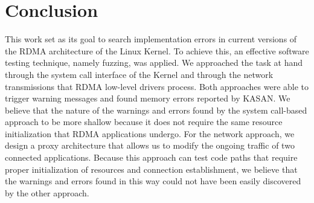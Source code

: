 \section{Conclusion}

This work set as its goal to search implementation errors in current versions of the RDMA architecture of the Linux Kernel.
To achieve this, an effective software testing technique, namely fuzzing, was applied.
We approached the task at hand through the system call interface of the Kernel and through the network transmissions that RDMA low-level
drivers process. Both approaches were able to trigger warning messages and found memory errors reported by KASAN.\@
We believe that the nature
of the warnings and errors found by the system call-based approach to be more shallow because it does not require the same resource initialization that RDMA applications undergo.  For the network approach,
we design a proxy architecture that allows us to modify the ongoing traffic of two connected applications. Because this approach can test code paths that require proper initialization of resources and connection
establishment, we believe that the warnings and errors found in this way
could not have been easily discovered by the other approach.
